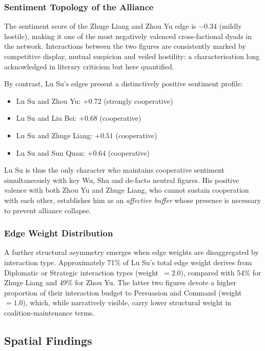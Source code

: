 \documentclass[12pt, a4paper]{article}
\begin{document}
\subsubsection{Sentiment Topology of the Alliance}

The sentiment score of the Zhuge Liang and Zhou Yu edge is $-0.34$
(mildly hostile), making it one of the most negatively valenced
cross-factional dyads in the network.
Interactions between the two figures are consistently marked by
competitive display, mutual suspicion and veiled hostility: a
characterisation long acknowledged in literary criticism but here
quantified.

By contrast, Lu Su's edges present a distinctively positive sentiment
profile:
\begin{itemize}[noitemsep]
  \item Lu Su and Zhou Yu: $+0.72$ (strongly cooperative)
  \item Lu Su and Liu Bei: $+0.68$ (cooperative)
  \item Lu Su and Zhuge Liang: $+0.51$ (cooperative)
  \item Lu Su and Sun Quan: $+0.64$ (cooperative)
\end{itemize}

Lu Su is thus the only character who maintains cooperative sentiment
simultaneously with key Wu, Shu and de-facto neutral figures.
His positive valence with both Zhou Yu and Zhuge Liang, who cannot
sustain cooperation with each other, establishes him as an
\emph{affective buffer} whose presence is necessary to prevent
alliance collapse.

\subsubsection{Edge Weight Distribution}

A further structural asymmetry emerges when edge weights are disaggregated
by interaction type.
Approximately 71\% of Lu Su's total edge weight derives from Diplomatic
or Strategic interaction types (weight~$= 2.0$), compared with 54\% for
Zhuge Liang and 49\% for Zhou Yu.
The latter two figures devote a higher proportion of their interaction
budget to Persuasion and Command (weight~$= 1.0$), which, while narratively
visible, carry lower structural weight in coalition-maintenance terms.

\subsection{Spatial Findings}
\label{sec:spatial_results}
\end{document}
